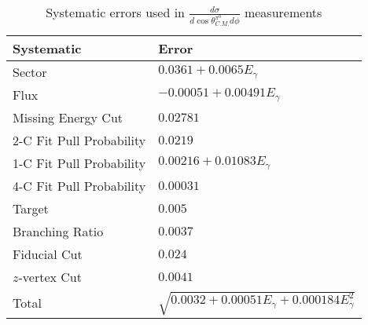 \begin{table}[h!]
\begin{minipage}{\textwidth}
\begin{center}


\caption[Systematics]{\label{tab:systematics}Systematic errors used in $\frac{d\sigma}{d\cos\theta^{\pi^0}_{C.M.} d\phi}$ measurements \vspace{0.75mm}}

\begin{tabular}{p{5cm} | p{7cm}}
\hline
Systematic & Error \\
\hline
Sector  & $ 0.0361 + 0.0065E_{\gamma}$ \\
Flux  & $ -0.00051 + 0.00491E_{\gamma}$ \\
Missing Energy Cut  & $0.02781$ \\
2-C Fit Pull Probability & $0.0219$ \\
1-C Fit Pull Probability  & $ 0.00216 + 0.01083E_{\gamma}$ \\
4-C Fit Pull Probability  & $0.00031$ \\ 
Target  & $0.005$ \\
Branching Ratio  & $0.0037$ \\
Fiducial Cut & $0.024$ \\
$z$-vertex Cut & $0.0041$ \\
Total & $\sqrt{0.0032 +0.00051E_{\gamma} +0.000184E_{\gamma}^2}$ \\
\hline \hline
\end{tabular}


\end{center}
\end{minipage}
\end{table}
\vspace{20pt}